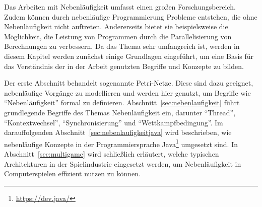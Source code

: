 Das Arbeiten mit Nebenläufigkeit umfasst einen großen Forschungsbereich. Zudem können durch nebenläufige Programmierung Probleme entstehen, die ohne Nebenläufigkeit nicht auftreten. Andererseits bietet sie beispielsweise die Möglichkeit, die Leistung von Programmen durch die Parallelisierung von Berechnungen zu verbessern. Da das Thema sehr umfangreich ist, werden in diesem Kapitel werden zunächst einige Grundlagen eingeführt, um eine Basis für das Verständnis der in der Arbeit genutzten Begriffe und Konzepte zu bilden. 

Der erste Abschnitt behandelt sogenannte Petri-Netze. Diese sind dazu geeignet, nebenläufige Vorgänge zu modellieren und werden hier genutzt, um Begriffe wie \enquote{Nebenläufigkeit} formal zu definieren. Abschnitt~\ref{sec:nebenlaufigkeit} führt grundlegende Begriffe des Themas Nebenläufigkeit ein, darunter \enquote{Thread}, \enquote{Kontextwechsel}, \enquote{Synchronisierung} und \enquote{Wettkampfbedingung}. Im darauffolgenden Abschnitt~\ref{sec:nebenlaufigkeitjava} wird beschrieben, wie nebenläufige Konzepte in der Programmiersprache Java\footnote{\url{https://dev.java/}} umgesetzt sind. In Abschnitt~\ref{sec:multigame} wird schließlich erläutert, welche typischen Architekturen in der Spielindustrie eingesetzt werden, um Nebenläufigkeit in Computerspielen effizient nutzen zu können.
